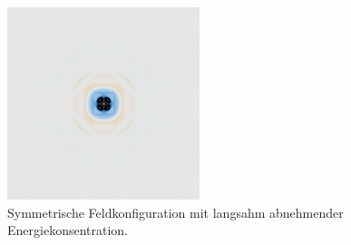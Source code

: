 \begin{figure}
    \begin{center}
        \includegraphics[width=0.5\textwidth]{papers/particles/figures/simulations/particle_frames/frame_06.png}
        \caption{Symmetrische Feldkonfiguration mit langsahm abnehmender Energiekonsentration.\ }\label{particles:fig:partikel:abnehmen:symmetrisch}
    \end{center}
\end{figure}